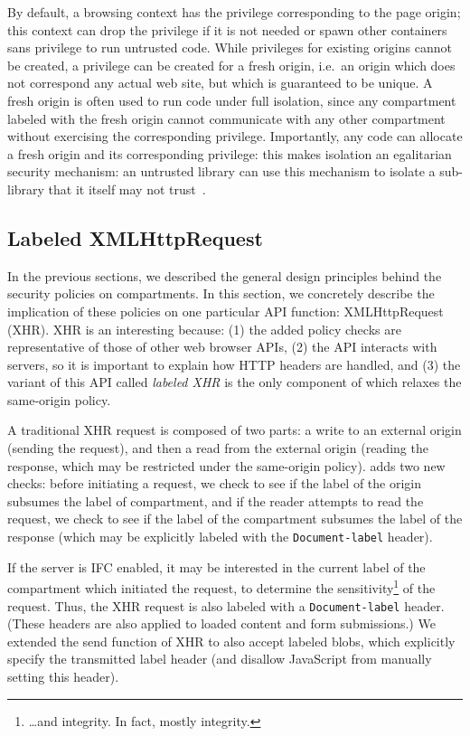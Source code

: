 By default, a browsing context has the privilege corresponding to the
page origin; this context can drop the privilege if it is not
needed or spawn other containers sans privilege to run untrusted code.
%
While privileges for existing origins cannot be created, a privilege can
be created for a fresh origin, i.e.\ an origin which does not correspond
any actual web site, but which is guaranteed to be unique.
%
A fresh origin is often used to run code under full isolation, since any
compartment labeled with the fresh origin cannot communicate with any
other compartment without exercising the corresponding privilege.
%
Importantly, any code can allocate a fresh origin and its corresponding privilege: this
makes isolation an egalitarian security mechanism: an untrusted library
can use this mechanism to isolate a sub-library that it itself
may not trust~\cite{Zeldovich:2006}.

\subsection{Labeled XMLHttpRequest}
\label{sec:labeled-xhr}

In the previous sections, we described the general design principles
behind the security policies on compartments.
%
In this section, we concretely describe the implication of these
policies on one particular API function: XMLHttpRequest (XHR).
%
XHR is an interesting because: (1) the added \sys{} policy checks are
representative of those of other web browser APIs, (2) the API
interacts with servers, so it is important to explain how HTTP headers are
handled, and (3) the variant of this API called \emph{labeled XHR} is
the only component of \sys{} which relaxes the same-origin policy.

A traditional XHR request is composed of two parts: a write to an
external origin (sending the request), and then a read from the external
origin (reading the response, which may be restricted under the
same-origin policy).
%
\sys{} adds two new checks: before initiating a
request, we check to see if the label of the origin subsumes the label
of compartment, and if the reader attempts to read the request, we check
to see if the label of the compartment subsumes the label of the response
(which may be explicitly labeled with the {\tt Document-label} header).

If the server is IFC enabled, it may be interested in the current label
of the compartment which initiated the request, to determine the
sensitivity\footnote{\ldots and integrity. In fact, mostly integrity.} of the request.
%
Thus, the XHR request is also labeled with a {\tt Document-label} header.
%
(These headers are also applied to loaded content and form submissions.)
%
We extended the send function of XHR to also accept labeled blobs,
which explicitly specify the transmitted label header (and disallow
JavaScript from manually setting this header).

